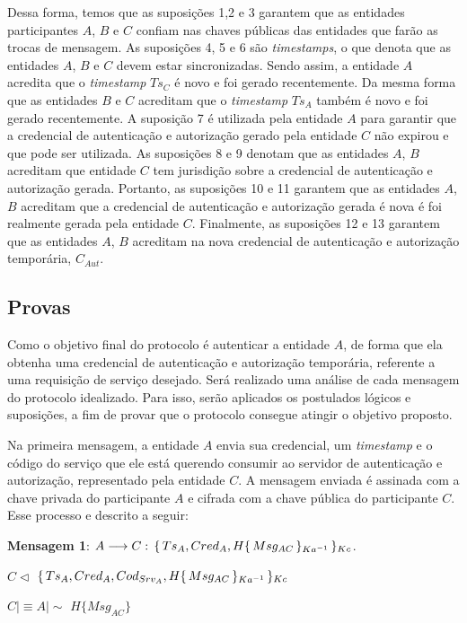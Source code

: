 Dessa forma, temos que as suposições 1,2 e 3 garantem que as entidades participantes ${A}$, ${B}$ e ${C}$ confiam  nas chaves públicas das entidades que farão as trocas de mensagem. As suposições 4, 5 e 6 são \emph{timestamps}, o que denota que as entidades ${A}$, ${B}$ e ${C}$ devem estar sincronizadas. Sendo assim, a entidade ${A}$ acredita que o \emph{timestamp} ${Ts_C}$ é novo e foi gerado recentemente. Da mesma forma que as entidades ${B}$ e ${C}$ acreditam  que o \emph{timestamp} ${Ts_A}$ também é novo e foi gerado recentemente. A suposição 7 é utilizada pela entidade ${A}$ para garantir que a credencial de autenticação e autorização gerado pela entidade ${C}$ não expirou e que pode ser utilizada. As suposições 8 e 9 denotam que as entidades ${A}$, ${B}$ acreditam que entidade ${C}$ tem jurisdição  sobre a credencial de autenticação e autorização gerada. Portanto, as suposições 10 e 11 garantem que as entidades ${A}$, ${B}$ acreditam que a credencial de autenticação e autorização gerada é nova é foi realmente gerada pela entidade ${C}$. Finalmente, as suposições 12 e 13 garantem que as entidades ${A}$, ${B}$ acreditam na nova credencial de autenticação e autorização temporária, ${C_{Aut}}$.

\subsection{Provas}

Como o objetivo final do protocolo é autenticar a entidade ${A}$, de forma que ela obtenha uma credencial de autenticação e autorização temporária, referente a uma requisição de serviço desejado. Será realizado uma análise de cada mensagem  do protocolo idealizado. Para isso, serão aplicados os postulados lógicos e suposições, a fim de provar que o protocolo consegue atingir o objetivo proposto.

Na primeira mensagem, a entidade ${A}$ envia sua credencial, um \emph{timestamp} e o código do serviço que ele está querendo consumir ao servidor de autenticação e autorização, representado pela entidade ${C}$. A mensagem enviada é assinada com a chave privada do participante ${A}$  e cifrada com a chave pública do participante ${C}$. Esse processo e descrito a seguir:

\textbf{Mensagem 1}: ${A}\longrightarrow{C}:\,{\{\,{Ts_A,Cred_A,H{\{\,{Msg_{AC}}\,\}_{Ka ^{-1}}}}\,\}_{Kc}}$.

$C\triangleleft$ ${\{\,{Ts_A,Cred_A,Cod_{Srv_A},H{\{\,{Msg_{AC}}\,\}_{Ka ^{-1}}}}\,\}_{Kc}}$

$C\mid\equiv A \mid\sim $  $H\{Msg_{AC}\}$


